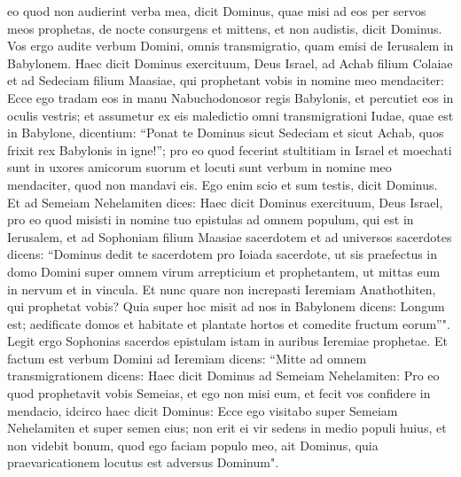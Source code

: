 \begin{biblechapter}
\verse eo quod non audierint verba mea, dicit Dominus, quae misi ad eos per servos meos prophetas, de nocte consurgens et mittens, et non audistis, dicit Dominus. 
\verse Vos ergo audite verbum Domini, omnis transmigratio, quam emisi de Ierusalem in Babylonem. 
\verse Haec dicit Dominus exercituum, Deus Israel, ad Achab filium Colaiae et ad Sedeciam filium Maasiae, qui prophetant vobis in nomine meo mendaciter: Ecce ego tradam eos in manu Nabuchodonosor regis Babylonis, et percutiet eos in oculis vestris; 
\verse et assumetur ex eis maledictio omni transmigrationi Iudae, quae est in Babylone, dicentium: “Ponat te Dominus sicut Sedeciam et sicut Achab, quos frixit rex Babylonis in igne!”; 
\verse pro eo quod fecerint stultitiam in Israel et moechati sunt in uxores amicorum suorum et locuti sunt verbum in nomine meo mendaciter, quod non mandavi eis. Ego enim scio et sum testis, dicit Dominus. 
\verse Et ad Semeiam Nehelamiten dices: 
\verse Haec dicit Dominus exercituum, Deus Israel, pro eo quod misisti in nomine tuo epistulas ad omnem populum, qui est in Ierusalem, et ad Sophoniam filium Maasiae sacerdotem et ad universos sacerdotes dicens: 
\verse “Dominus dedit te sacerdotem pro Ioiada sacerdote, ut sis praefectus in domo Domini super omnem virum arrepticium et prophetantem, ut mittas eum in nervum et in vincula. 
\verse Et nunc quare non increpasti Ieremiam Anathothiten, qui prophetat vobis? 
\verse Quia super hoc misit ad nos in Babylonem dicens: Longum est; aedificate domos et habitate et plantate hortos et comedite fructum eorum”". 
\verse Legit ergo Sophonias sacerdos epistulam istam in auribus Ieremiae prophetae. 
\verse Et factum est verbum Domini ad Ieremiam dicens: 
\verse “Mitte ad omnem transmigrationem dicens: Haec dicit Dominus ad Semeiam Nehelamiten: Pro eo quod prophetavit vobis Semeias, et ego non misi eum, et fecit vos confidere in mendacio, 
\verse idcirco haec dicit Dominus: Ecce ego visitabo super Semeiam Nehelamiten et super semen eius; non erit ei vir sedens in medio populi huius, et non videbit bonum, quod ego faciam populo meo, ait Dominus, quia praevaricationem locutus est adversus Dominum". 
\end{biblechapter}

